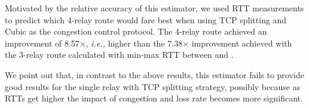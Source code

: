 \documentclass[10pt,sigconf]{acmart}
\newcommand{\mycomm}[3]{{\color{#2} \textbf{[#1: #3]}}}
\newcommand{\mycomm}[3]{}
\newcommand{\IK}[1]{\mycomm{IK}{blue}{#1}}
\newcommand{\AB}[1]{\mycomm{AB}{orange}{#1}}
\providecommand{\ie}{\emph{i.e.,} }
\begin{document}
Motivated by the relative accuracy of this estimator, we used RTT measurements to predict which 4-relay route would fare best when using TCP splitting and Cubic as the congestion control protocol. The 4-relay route achieved an improvement of 8.57$\times$, \ie higher than the 7.38$\times$ improvement achieved with the 3-relay route calculated with min-max RTT between \rc and \rs. 
 
We point out that, in contrast to the above results, this estimator fails to provide good results for the single relay with TCP splitting strategy, possibly because as RTTs get higher the impact of congestion and loss rate becomes more significant.
\end{document}

